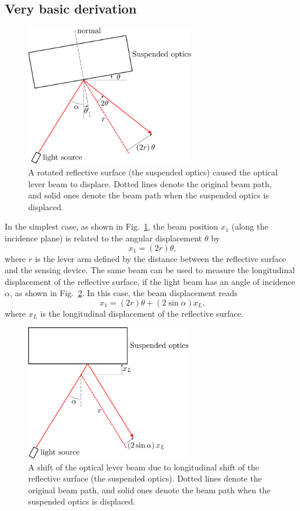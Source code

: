 \subsection{Very basic derivation \label{sec:very_basic_derivation}}
\begin{figure}[!h]
	\centering
	\includegraphics[width=73mm]{figures/optical_lever_rotation}
	\caption{A rotated reflective surface (the suspended optics) caused the optical lever beam to displace. Dotted lines denote the original beam path, and solid ones denote the beam path when the suspended optics is displaced.}
	\label{fig:opticalleverrotation}
\end{figure}
In the simplest case, as shown in Fig.~\ref{fig:opticalleverrotation}, the beam position $x_1$ (along the incidence plane) is related to the angular displacement $\theta$ by
\begin{equation}
	x_1=\left(2r\right)\theta,
	\label{eqn:x1}
\end{equation}
where $r$ is the lever arm defined by the distance between the reflective surface and the sensing device.
The same beam can be used to measure the longitudinal displacement of the reflective surface, if the light beam has an angle of incidence $\alpha$, as shown in Fig.~\ref{fig:opticallevershifted}.
In this case, the beam displacement reads
\begin{equation}
	x_1=\left(2r\right)\theta + \left(2\sin{\alpha}\right)x_L,
	\label{eqn:beam_displacement_l}
\end{equation}
where $x_L$ is the longitudinal displacement of the reflective surface.
\begin{figure}[!h]
	\centering
	\includegraphics[width=72mm]{figures/optical_lever_shifted}
	\caption{A shift of the optical lever beam due to longitudinal shift of the reflective surface (the suspended optics). Dotted lines denote the original beam path, and solid ones denote the beam path when the suspended optics is displaced.}
	\label{fig:opticallevershifted}
\end{figure}
